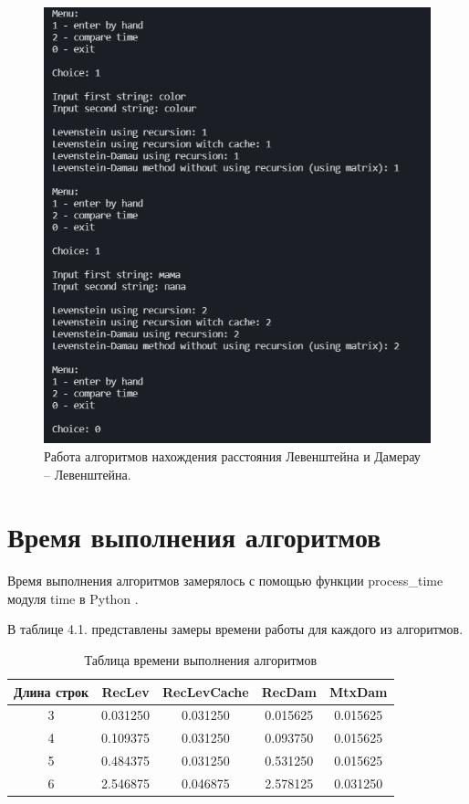 \documentclass[12pt]{report}
\begin{document}
\begin{figure}[h]
	\begin{center}
	\includegraphics[scale=0.9]{example.png}
	 \caption{Работа алгоритмов нахождения расстояния Левенштейна и Дамерау -- Левенштейна.}
	\end{center}
\end{figure}

\section{Время выполнения алгоритмов}
Время выполнения алгоритмов замерялось с помощью функции process\_time модуля time в Python  \cite{process}. \newline

В таблице 4.1. представлены замеры времени работы для каждого из алгоритмов.

\begin{table} [h!]
	\caption{Таблица времени выполнения алгоритмов}
	\begin{center}
		\begin{tabular}{|c c c c c|} 
		 	\hline
			Длина строк & RecLev & RecLevCache & RecDam & MtxDam \\  
		 	\hline
		 	3 & 0.031250 & 0.031250 & 0.015625 & 0.015625\\
		 	\hline
		 	4 & 0.109375 & 0.031250 & 0.093750 & 0.015625 \\
		 	\hline
			5 & 0.484375 & 0.031250 & 0.531250 & 0.015625 \\
			\hline
			6 & 2.546875 & 0.046875 & 2.578125 & 0.031250 \\
			\hline
		\end{tabular}
	\end{center}
\end{table}
\end{document}
